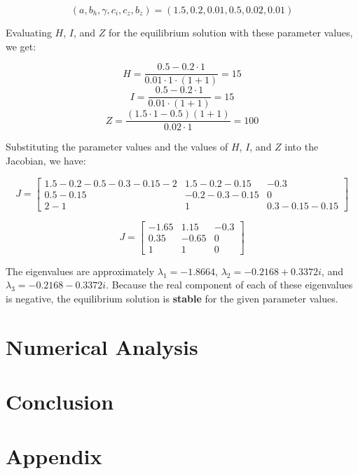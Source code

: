\documentclass[
	12pt
]{article}
\begin{document}
\begin{equation}
(a,b_h,\gamma,c_i,c_z,b_z)=(1.5,0.2,0.01,0.5,0.02,0.01)
\end{equation}

Evaluating $H$, $I$, and $Z$ for the equilibrium solution with these parameter values, we get:

\begin{equation}
    H = \frac{0.5-0.2\cdot1}{0.01\cdot1\cdot(1+1)} = 15
\end{equation}
\begin{equation}
    I = \frac{0.5-0.2\cdot1}{0.01\cdot(1+1)} = 15
\end{equation}
\begin{equation}
    Z = \frac{(1.5\cdot1-0.5)(1+1)}{0.02\cdot1} = 100
\end{equation}

Substituting the parameter values and the values of $H$, $I$, and $Z$ into the Jacobian, we have:

$$
J=\begin{bmatrix} 1.5-0.2-0.5-0.3-0.15-2 & 1.5-0.2-0.15 & -0.3 \\ 0.5 - 0.15 & -0.2-0.3-0.15 & 0 \\ 2-1 & 1 & 0.3-0.15-0.15 \end{bmatrix}
$$

$$
J=\begin{bmatrix} -1.65 & 1.15 & -0.3 \\ 0.35 & -0.65 & 0 \\ 1 & 1 & 0 \end{bmatrix}
$$

The eigenvalues are approximately $\lambda_1=-1.8664$, $\lambda_2=-0.2168+0.3372i$, and $\lambda_3=-0.2168-0.3372i$. Because the real component of each of these eigenvalues is negative, the equilibrium solution is \textbf{stable} for the given parameter values.

\section{Numerical Analysis}

\section{Conclusion}

\section{Appendix}
\end{document}
